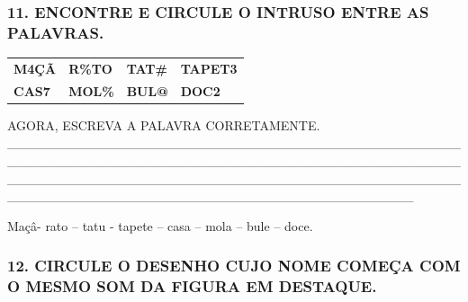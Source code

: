 \subsubsection{11. ENCONTRE E CIRCULE O INTRUSO ENTRE AS
PALAVRAS.}\label{encontre-e-circule-o-intruso-que-estuxe1-nas-palavras.}

\begin{longtable}[]{@{}llll@{}}
\toprule
\textbf{M4ÇÃ} & \textbf{R\%TO} & \textbf{TAT\#} &
\textbf{TAPET3}\tabularnewline
\textbf{CAS7} & \textbf{MOL\%} & \textbf{BUL@} &
\textbf{DOC2}\tabularnewline
\bottomrule
\end{longtable}

AGORA, ESCREVA A PALAVRA CORRETAMENTE.
\_\_\_\_\_\_\_\_\_\_\_\_\_\_\_\_\_\_\_\_\_\_\_\_\_\_\_\_\_\_\_\_\_\_\_\_\_\_\_\_\_\_\_\_\_\_\_\_\_\_\_\_\_\_\_\_\_\_\_\_\_\_\_\_\_\_\_\_\_\_\_\_\_\_\_\_\_\_\_\_\_\_\_\_\_\_\_\_\_\_\_\_\_\_\_\_\_\_\_\_\_\_\_\_\_\_\_\_\_\_\_\_\_\_\_\_\_\_\_\_\_\_\_\_\_\_\_\_\_\_\_\_\_\_\_\_\_\_\_\_\_\_\_\_\_\_\_\_\_\_\_\_\_\_\_\_\_\_\_\_\_\_\_\_\_\_\_\_\_\_\_\_\_\_\_\_\_\_\_\_\_\_\_\_\_\_\_

Maçâ- rato -- tatu - tapete -- casa -- mola -- bule -- doce.

\subsubsection{12. CIRCULE O DESENHO CUJO NOME COMEÇA COM O MESMO SOM DA
FIGURA EM
DESTAQUE.}\label{circule-o-desenho-cujo-nome-comeuxe7a-com-o-mesmo-som-da-figura-em-destaque.}

